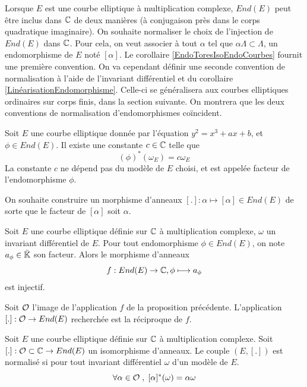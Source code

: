 Lorsque $E$ est une courbe elliptique à multiplication complexe, $End(E)$ peut être inclus dans $\mathbb{C}$ de deux manières (à conjugaison près dans le corps quadratique imaginaire). On souhaite normaliser le choix de l'injection de $End(E)$ dans $\mathbb{C}$. Pour cela, on veut associer à tout $\alpha$ tel que $\alpha\Lambda\subset\Lambda$, un endomorphisme de $E$ noté $[\alpha]$. Le corollaire \ref{EndoToresIsoEndoCourbes} fournit une première convention. On va cependant définir une seconde convention de normalisation à l'aide de l'invariant différentiel et du corollaire \ref{LinéarisationEndomorphisme}. Celle-ci se généralisera aux courbes elliptiques ordinaires sur corps finis, dans la section suivante. On montrera que les deux conventions de normalisation d'endomorphismes coïncident.

\begin{Def}
	Soit $E$ une courbe elliptique donnée par l'équation $y^2 = x^3 + ax + b$, et $\phi\in End(E)$. Il existe une constante $c\in\mathbb{C}$ telle que 
	\begin{equation*}
		(\phi)^{*}(\omega_E) = c\omega_E
	\end{equation*}
	La constante $c$ ne dépend pas du modèle de $E$ choisi, et est appelée facteur de l'endomorphisme $\phi$.
\end{Def}

On souhaite construire un morphisme d'anneaux $[.] :\alpha\mapsto\left[ \alpha\right]\in End(E)$ de sorte que le facteur de $\left[ \alpha\right]$ soit $\alpha$. 

\begin{Prop}
	Soit $E$ une courbe elliptique définie sur $\mathbb{C}$ à multiplication complexe, $\omega$ un invariant différentiel de $E$. Pour tout endomorphisme $\phi\in End(E)$, on note $a_{\phi}\in\bar{\mathbb{K}}$ son facteur. Alors le morphisme d'anneaux
	\begin{equation*}
		f : End(E)\rightarrow\mathbb{C} , \phi\longmapsto a_{\phi}
	\end{equation*}
	est injectif.
\end{Prop}


Soit $\mathcal{O}$ l'image de l'application $f$ de la proposition précédente. L'application $[.] : \mathcal{O} \rightarrow End(E)$ recherchée est la réciproque de $f$. 

\begin{Def}
	Soit $E$ une courbe elliptique définie sur $\mathbb{C}$ à multiplication complexe. Soit $[.] : \mathcal{O}\subset\mathbb{C}\rightarrow End(E)$ un isomorphisme d'anneaux. Le couple $(E,[.])$ est normalisé si pour tout invariant différentiel $\omega$ d'un modèle de $E$.
	\begin{equation*}
		\forall\alpha\in\mathcal{O}\;,\; [\alpha]^{*}(\omega) = \alpha\omega
	\end{equation*}
\end{Def}


